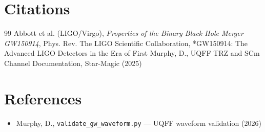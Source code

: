 \documentclass[12pt,a4paper]{article}
\begin{document}
\section*{Citations}
\begin{thebibliography}{99}
 Abbott et al. (LIGO/Virgo), \emph{Properties of the Binary Black Hole Merger GW150914}, Phys. Rev.
 The LIGO Scientific Collaboration, *GW150914: The Advanced LIGO Detectors in the Era of First
 Murphy, D., UQFF TRZ and SCm Channel Documentation, Star-Magic (2025)
\end{thebibliography}

\section*{References}
\begin{itemize}
  \item[4.] Murphy, D., \texttt{validate\_{gw\_waveform}.py} --- UQFF waveform validation (2026)
\end{itemize}

\end{document}
